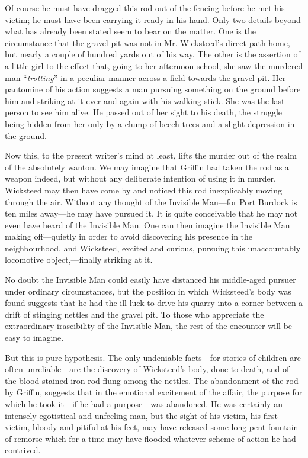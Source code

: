Of course he must have dragged this rod out of the fencing before he met his victim; he must have been carrying it ready in his hand. Only two details beyond what has already been stated seem to bear on the matter. One is the circumstance that the gravel pit was not in Mr. Wicksteed’s direct path home, but nearly a couple of hundred yards out of his way. The other is the assertion of a little girl to the effect that, going to her afternoon school, she saw the murdered man “\emph{trotting}” in a peculiar manner across a field towards the gravel pit. Her pantomine of his action suggests a man pursuing something on the ground before him and striking at it ever and again with his walking-stick. She was the last person to see him alive. He passed out of her sight to his death, the struggle being hidden from her only by a clump of beech trees and a slight depression in the ground.

Now this, to the present writer’s mind at least, lifts the murder out of the realm of the absolutely wanton. We may imagine that Griffin had taken the rod as a weapon indeed, but without any deliberate intention of using it in murder. Wicksteed may then have come by and noticed this rod inexplicably moving through the air. Without any thought of the Invisible Man—for Port Burdock is ten miles away—he may have pursued it. It is quite conceivable that he may not even have heard of the Invisible Man. One can then imagine the Invisible Man making off—quietly in order to avoid discovering his presence in the neighbourhood, and Wicksteed, excited and curious, pursuing this unaccountably locomotive object,—finally striking at it.

No doubt the Invisible Man could easily have distanced his middle-aged pursuer under ordinary circumstances, but the position in which Wicksteed’s body was found suggests that he had the ill luck to drive his quarry into a corner between a drift of stinging nettles and the gravel pit. To those who appreciate the extraordinary irascibility of the Invisible Man, the rest of the encounter will be easy to imagine.

But this is pure hypothesis. The only undeniable facts—for stories of children are often unreliable—are the discovery of Wicksteed’s body, done to death, and of the blood-stained iron rod flung among the nettles. The abandonment of the rod by Griffin, suggests that in the emotional excitement of the affair, the purpose for which he took it—if he had a purpose—was abandoned. He was certainly an intensely egotistical and unfeeling man, but the sight of his victim, his first victim, bloody and pitiful at his feet, may have released some long pent fountain of remorse which for a time may have flooded whatever scheme of action he had contrived.


